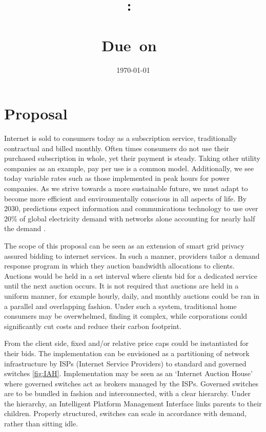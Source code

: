 \documentclass{article}
\title{
    \vspace{2in}
    \textmd{\textbf{\hmwkClass:\ \\ \hmwkTitle}}\\
    \normalsize\vspace{0.1in}\small{Due\ on\ \hmwkDueDate}\\
    \vspace{0.1in}\Large{\textit{\paprTitle}}
    \vspace{3in}
}
\author{\hmwkAuthorName}
\date{\today}
\begin{document}
\maketitle

\pagebreak

\newpage


\section{Proposal}
Internet is sold to consumers today as a subscription service, traditionally contractual and billed monthly.
Often times consumers do not use their purchased subscription in whole, yet their payment is steady.
Taking other utility companies as an example, pay per use is a common model.
Additionally, we see today variable rates such as those implemented in peak hours for power companies.
As we strive towards a more sustainable future, we must adapt to become more efficient and environmentally conscious in all aspects of life.
By 2030, predictions expect information and communications technology to use over 20\% of global electricity demand with networks alone accounting for nearly half the demand \cite{Jones_2018}.

The scope of this proposal can be seen as an extension of smart grid privacy assured bidding \cite{7812774} to internet services.
In such a manner, providers tailor a demand response program in which they auction bandwidth allocations to clients.
Auctions would be held in a set interval where clients bid for a dedicated service until the next auction occurs.
It is not required that auctions are held in a uniform manner, for example hourly, daily, and monthly auctions could be ran in a parallel and overlapping fashion.
Under such a system, traditional home consumers may be overwhelmed, finding it complex, while corporations could significantly cut costs and reduce their carbon footprint.

From the client side, fixed and/or relative price caps could be instantiated for their bids.
The implementation can be envisioned as a partitioning of network infrastructure by ISPs (Internet Service Providers) to standard and governed switches \ref{fig:IAH}.
Implementation may be seen as an `Internet Auction House' where governed switches act as brokers managed by the ISPs.
Governed switches are to be bundled in fashion and interconnected, with a clear hierarchy.
Under the hierarchy, an Intelligent Platform Management Interface links parents to their children.
Properly structured, switches can scale in accordance with demand, rather than sitting idle.
\end{document}
